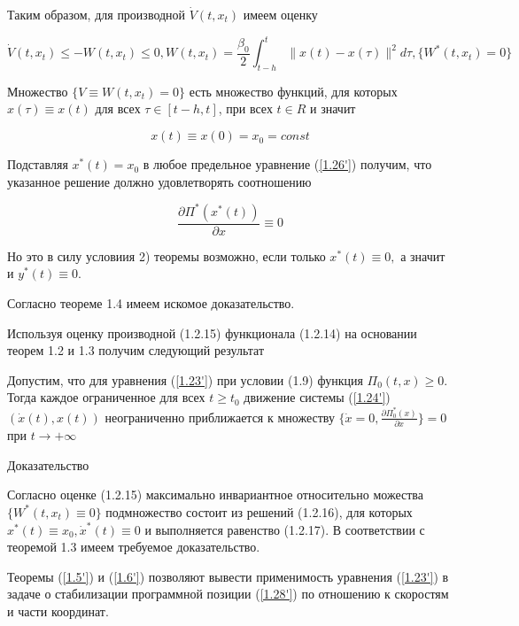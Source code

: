 Таким образом, для производной $\dot V(t, x_t)$ имеем оценку

\begin{equation} \label{1.28'}
\dot V(t, x_t) \le - W(t, x_t) \le 0, W(t, x_t) = \frac{\beta_0}{2} \int_{t - h}^{t} \| x(t) - x(\tau) \| ^ 2 d \tau, \lbrace W^{*} (t, x_t) = 0 \rbrace
\end{equation}

Множество $ \lbrace V \equiv {W(t, x_t) = 0} \rbrace$ есть множество функций, для которых $x(\tau) \equiv x(t)$ для всех $\tau \in [t - h, t]$, при всех $t \in R$ и значит 

\begin{equation} \label{1.29'}
x(t) \equiv x(0) = x_0 = const
\end{equation}

Подставляя $x^{*}(t) = x_0$ в любое предельное уравнение (\ref{1.26'}) получим, что указанное решение должно удовлетворять соотношению 

\begin{equation} \label{1.30'}
\frac{\partial \Pi^{*} (x^{*} (t))}{\partial x} \equiv 0
\end{equation}

Но это в силу условиия 2) теоремы возможно, если только $x^{*} (t) \equiv 0,$ а значит и $y^{*}(t) \equiv 0.$

Согласно теореме 1.4 имеем искомое доказательство.

Используя оценку производной (1.2.15) функционала (1.2.14) на основании теорем 1.2 и 1.3 получим следующий результат

\begin{theorem}\label{t-1.8}
Допустим, что для уравнения (\ref{1.23'}) при условии (1.9) функция $\Pi_0 (t, x) \ge 0$. Тогда каждое ограниченное для всех $t \ge t_0$ движение системы (\ref{1.24'}) $(\dot x(t), x(t))$ неограниченно приближается к множеству $ \lbrace \dot x = 0, \frac{\partial \Pi_0^{*} (x)}{\partial x} \rbrace = 0$ при $t \to + \infty$
\end{theorem}

Доказательство

Согласно оценке (1.2.15) максимально инвариантное относительно можества $\lbrace W^{*}(t, x_t) \equiv 0 \rbrace$ подмножество состоит из решений (1.2.16), для которых $x^{*} (t) \equiv x_0, \dot x^{*}(t) \equiv 0$ и выполняется равенство (1.2.17). В соответствии с теоремой 1.3 имеем требуемое доказательство.

Теоремы (\ref{1.5'}) и (\ref{1.6'}) позволяют вывести применимость уравнения (\ref{1.23'}) в задаче о стабилизации программной позиции (\ref{1.28'}) по отношению к скоростям и части координат. 

